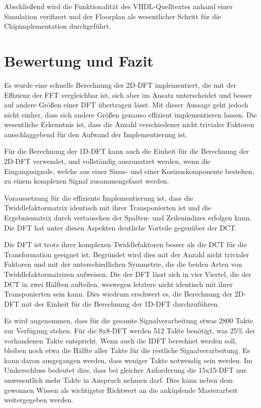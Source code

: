  Abschließend wird die Funktionalität des VHDL-Quelltextes anhand einer Simulation verifizert und der Floorplan als wesentlicher Schritt für die Chipimplementation durchgeführt.
 
 
 \section{Bewertung und Fazit}

 Es wurde eine schnelle Berechnung der 2D-DFT implementiert, die mit der Effizienz der FFT vergleichbar ist, sich aber im Ansatz unterscheidet und besser auf andere Größen einer DFT übertragen lässt.
 Mit dieser Aussage geht jedoch nicht einher, dass sich andere Größen genauso effizient implementieren lassen. 
 Die wesentliche Erkenntnis ist, dass die Anzahl verschiedener nicht trivialer Faktoren ausschlaggebend für den Aufwand der Implementierung ist. 

 
 Für die Berechnung der 1D-DFT kann auch die Einheit für die Berechnung der 2D-DFT verwendet, und  vollständig auszunutzet werden,
 wenn die Eingangssignale, welche aus einer Sinus- und einer Kosinuskomponente bestehen, zu einem komplexen Signal zusammengefasst werden.
 
 Voraussetzung für die effiziente Implementierung ist, dass die Twiddlefaktormatrix identisch mit ihrer Transponierten ist und die Ergebnismatrix durch vertauschen der Spalten- und Zeilenindizes erfolgen kann.
 Die DFT hat  unter diesen Aspekten deutliche Vorteile gegenüber der DCT.
  
 Die DFT ist trotz ihrer komplexen Twiddlefaktoren besser als die DCT für die Transformation geeignet ist. Begründet wird dies mit der Anzahl nicht trivialer
 Faktoren und mit der unterschiedlichen Symmetrie, die die beiden Arten von Twiddlefaktormatrizen aufweisen. Die der DFT lässt sich in vier Viertel, die der DCT in zwei Hälften
 aufteilen, weswegen letztere nicht identisch mit ihrer Transponierten sein kann. Dies wiedrum erschwert es, die Berechnung der 2D-DFT mit der Einheit für die Berechnung der 1D-DFT
 durchzuführen.
 
  Es wird angenommen, dass für die gesamte Signalverarbeitung etwas 2800 Takte zur Verfügung stehen.
 Für die 8x8-DFT werden 512 Takte benötigt, was  25\% der vorhandenen Takte entspricht. Wenn auch die IDFT berechnet werden soll, bleiben noch etwa die Hälfte aller Takte für die 
 restliche Signalverarbeitung. Es kann davon ausgegangen werden, dass weniger Takte notwendig sein werden. Im Umkerschluss bedeutet dies, dass bei gleicher Anforderung die 
 15x15-DFT nur unwesentlich mehr Takte in Anspruch nehmen darf. Dies kann neben dem gewonnen Wissen als wichtigster Richtwert an die anküpfende Masterarbeit weitergegeben werden.
 
